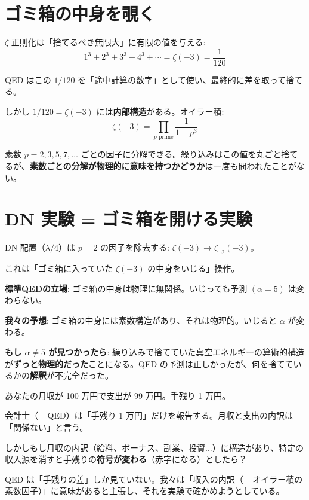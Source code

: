 \documentclass[12pt,a4paper]{article}
\begin{document}
\section{ゴミ箱の中身を覗く}

\begin{resultbox}[ゼータ関数による正則化はゴミ箱の中身を見る方法]
$\zeta$ 正則化は「捨てるべき無限大」に有限の値を与える:
$$1^3 + 2^3 + 3^3 + 4^3 + \cdots = \zeta(-3) = \frac{1}{120}$$

QED はこの $1/120$ を「途中計算の数字」として使い、最終的に差を取って捨てる。

しかし $1/120 = \zeta(-3)$ には\textbf{内部構造}がある。オイラー積:
$$\zeta(-3) = \prod_{p\text{ prime}} \frac{1}{1-p^3}$$

素数 $p = 2, 3, 5, 7, \ldots$ ごとの因子に分解できる。繰り込みはこの値を丸ごと捨てるが、\textbf{素数ごとの分解が物理的に意味を持つかどうか}は一度も問われたことがない。
\end{resultbox}

\section{DN 実験 = ゴミ箱を開ける実験}

\begin{resultbox}[何が見つかるか]
DN 配置（$\lambda/4$）は $p=2$ の因子を除去する: $\zeta(-3) \to \zeta_{\neg 2}(-3)$。

これは「ゴミ箱に入っていた $\zeta(-3)$ の中身をいじる」操作。

\textbf{標準QEDの立場}: ゴミ箱の中身は物理に無関係。いじっても予測 $(\alpha = 5)$ は変わらない。

\textbf{我々の予想}: ゴミ箱の中身には素数構造があり、それは物理的。いじると $\alpha$ が変わる。

\textbf{もし $\alpha \neq 5$ が見つかったら}: 繰り込みで捨てていた真空エネルギーの算術的構造が\textbf{ずっと物理的だった}ことになる。QED の予測は正しかったが、何を捨てているかの\textbf{解釈}が不完全だった。
\end{resultbox}

\begin{storybox}
あなたの月収が 100 万円で支出が 99 万円。手残り 1 万円。

会計士（= QED）は「手残り 1 万円」だけを報告する。月収と支出の内訳は「関係ない」と言う。

しかしもし月収の内訳（給料、ボーナス、副業、投資...）に構造があり、特定の収入源を消すと手残りの\textbf{符号が変わる}（赤字になる）としたら？

QED は「手残りの差」しか見ていない。我々は「収入の内訳（= オイラー積の素数因子）」に意味があると主張し、それを実験で確かめようとしている。
\end{storybox}
\end{document}
